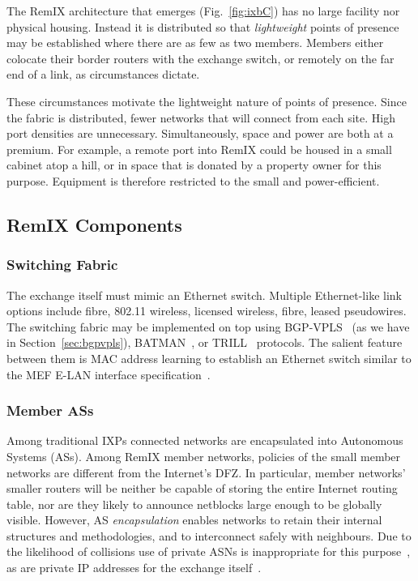 The RemIX architecture that emerges (Fig.~\ref{fig:ixbC}) has no large
facility nor physical housing. Instead it is distributed so that
\emph{lightweight} points of presence may be established where there
are as few as two members. Members either colocate their border
routers with the exchange switch, or remotely on the far end of a
link, as circumstances dictate.

These circumstances motivate the lightweight nature of points of
presence. Since the fabric is distributed, fewer networks that will
connect from each site. High port densities are unnecessary.
Simultaneously, space and power are both at a premium. For example, a
remote port into RemIX could be housed in a small cabinet atop a hill,
or in space that is donated by a property owner for this purpose.
Equipment is therefore restricted to the small and power-efficient.


\subsection{RemIX Components}

\subsubsection{Switching Fabric}

The exchange itself must mimic an
Ethernet switch. Multiple Ethernet-like link options include fibre, 802.11
wireless, licensed wireless, fibre, leased pseudowires. The switching fabric may
be implemented on top using \acs{BGP}-\acs{VPLS}~\cite{rfc4761} (as we have in
Section~\ref{sec:bgpvpls}), \acs{BATMAN}~\cite{johnson2008simple}, or
\acs{TRILL}~\cite{perlman2004rbridges} protocols. The salient feature between
them is MAC address learning to establish an Ethernet switch similar to the
\ac{MEF} E-LAN interface specification~\cite{mef62}.%

\subsubsection{Member \acp{AS}}

Among traditional \acp{IXP} connected networks are encapsulated into
Autonomous Systems (\acp{AS}). Among RemIX member networks,
policies of the small
member networks are
different from the Internet's \ac{DFZ}. In particular, member
networks' smaller routers will be neither be capable of storing the
entire Internet routing table, nor are they likely to announce
netblocks large enough to be globally visible.  However, \ac{AS}
\emph{encapsulation} enables networks to retain their internal
structures and methodologies, and to interconnect safely  with
neighbours. Due to the likelihood of collisions use of private
\acp{ASN} is inappropriate for this purpose~\cite{rfc6996}, as are
private IP addresses for the exchange itself~\cite{rfc1918}.

